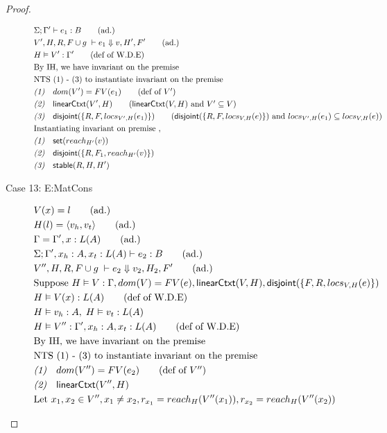 \documentclass{easychair}
\newcommand{\ms}[1]{\ensuremath{\mathsf{#1}}}
\newcommand{\na}[1]{\mathsf{linearCtxt}(#1)}
\newcommand{\stable}[1]{\mathsf{stable}(#1)}
\newcommand{\dist}[1]{\mathsf{disjoint}(#1)}
\theoremstyle{definition}
\begin{document}
\begin{proof}
\begin{description}
\begin{align*}
  &\Sigma; \Gamma' \vdash e_1 : B \tag{ad.}\\
  &V',H,R,F \cup g \; \vdash e_1 \Downarrow v, H',F' \tag{ad.}\\
  &H \vDash V' : \Gamma' \tag{def of W.D.E}\\
  &\text{By IH, we have invariant on the premise } \\
  &\text{NTS (1) - (3) to instantiate invariant on the premise } \\
  &\emph{(1)}\quad dom(V') = FV(e_1) \tag{def of $V'$}\\
  &\emph{(2)}\quad \na{V',H} \tag{$\na{V,H}$ and $V' \subseteq V$}\\
  &\emph{(3)}\quad \dist{\{R,F,locs_{V',H}(e_1)\}} \tag{$\dist{\{R,F,locs_{V,H}(e)\}}$ and $locs_{V',H}(e_1) \subseteq locs_{V,H}(e)$}\\
  &\text{Instantiating invariant on premise } ,\\
  &\emph{(1)}\quad \ms{set}(reach_{H'}(v))\\
  &\emph{(2)}\quad \dist{\{R,F_1,reach_{H'}(v)\}}\\
  &\emph{(3)}\quad \stable{R,H,H'}
  \end{align*}
  \item [Case 13: E:MatCons]
  \begin{align*}
  &V(x) = l \tag{ad.}\\
  &H(l) = \pairexcst{v_h}{v_t} \tag{ad.}\\
  &\Gamma = \Gamma', x : L(A) \tag{ad.}\\
  &\Sigma; \Gamma', x_h : A, x_t : L(A) \vdash e_2 : B \tag{ad.}\\
  &V'',H,R,F \cup g \; \vdash e_2 \Downarrow v_2, H_2, F' \tag{ad.} \\
  &\text{Suppose } H \vDash V : \Gamma, dom(V) = FV(e), \na{V,H},\dist{\{F,R,locs_{V,H}(e)\}}\\
  &H \vDash V(x) : L(A) \tag{def of W.D.E}\\
  &H\vDash v_h : A,\; H \vDash v_t : L(A) \\
  &H \vDash V'' : \Gamma', x_h : A, x_t : L(A) \tag{def of W.D.E}\\
  &\text{By IH, we have invariant on the premise} \\
  &\text{NTS (1) - (3) to instantiate invariant on the premise} \\
  &\emph{(1)}\quad dom(V'') = FV(e_2) \tag{def of $V''$}\\
  &\emph{(2)}\quad \na{V'',H} \\
  &\text{Let } x_1, x_2 \in V'', x_1 \ne x_2, r_{x_1} = reach_H(V''(x_1)), r_{x_2} = reach_H(V''(x_2))\\

\end{align*}
\end{description}
\end{proof}
\end{document}
